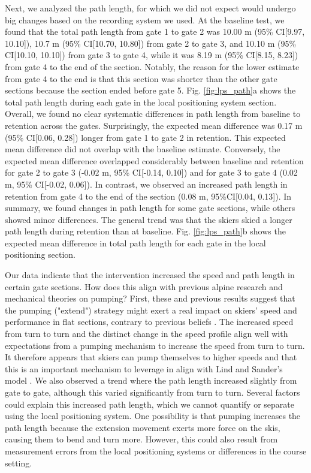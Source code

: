 Next, we analyzed the path length, for which we did not expect would undergo big changes based on the recording system we used. At the baseline test, we found that the total path length from gate 1 to gate 2 was 10.00 m (95\% CI[9.97, 10.10]), 10.7 m (95\% CI[10.70, 10.80]) from gate 2 to gate 3, and 10.10 m (95\% CI[10.10, 10.10]) from gate 3 to gate 4, while it was 8.19 m (95\% CI[8.15, 8.23]) from gate 4 to the end of the section. Notably, the reason for the lower estimate from gate 4 to the end is that this section was shorter than the other gate sections because the section ended before gate 5. Fig. \ref{fig:lps_path}a shows the total path length during each gate in the local positioning system section. Overall, we found no clear systematic differences in path length from baseline to retention across the gates. Surprisingly, the expected mean difference was 0.17 m (95\% CI[0.06, 0.28]) longer from gate 1 to gate 2 in retention. This expected mean difference did not overlap with the baseline estimate. Conversely, the expected mean difference overlapped considerably between baseline and retention for gate 2 to gate 3 (-0.02 m, 95\% CI[-0.14, 0.10]) and for gate 3 to gate 4 (0.02 m, 95\% CI[-0.02, 0.06]). In contrast, we observed an increased path length in retention from gate 4 to the end of the section (0.08 m, 95\%CI[0.04, 0.13]). In summary, we found changes in path length for some gate sections, while others showed minor differences. The general trend was that the skiers skied a longer path length during retention than at baseline. Fig. \ref{fig:lps_path}b shows the expected mean difference in total path length for each gate in the local positioning section. 

Our data indicate that the intervention increased the speed and path length in certain gate sections. How does this align with previous alpine research and mechanical theories on pumping? First, these and previous results suggest that the pumping ("extend") strategy might exert a real impact on skiers' speed and performance in flat sections, contrary to previous beliefs \cite{supej_differential_2008, supej_doba_2001}. The increased speed from turn to turn and the distinct change in the speed profile align well with expectations from a pumping mechanism to increase the speed from turn to turn. It therefore appears that skiers can pump themselves to higher speeds and that this is an important mechanism to leverage in align with Lind and Sander's model \cite{lind_physics_2004}. We also observed a trend where the path length increased slightly from gate to gate, although this varied significantly from turn to turn. Several factors could explain this increased path length, which we cannot quantify or separate using the local positioning system. One possibility is that pumping increases the path length because the extension movement exerts more force on the skis, causing them to bend and turn more. However, this could also result from measurement errors from the local positioning systems or differences in the course setting.


